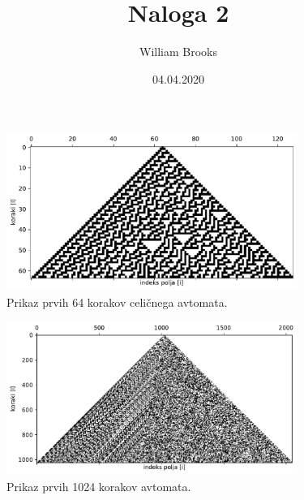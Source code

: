 \documentclass{article}
\title{Naloga 2}
\author{William Brooks}
\date{04.04.2020}
\begin{document}
\maketitle

\begin{figure}[h]
\begin{center}

    \includegraphics[width=9.5cm]{mat.pdf}
\caption{Prikaz prvih 64 korakov celi\v cnega avtomata.}

\end{center}
\end{figure}

\begin{figure}[h]
\begin{center}

    \includegraphics[width=9.5cm]{mat2.pdf}
\caption{Prikaz prvih 1024 korakov avtomata.}

\end{center}
\end{figure}
\end{document}
